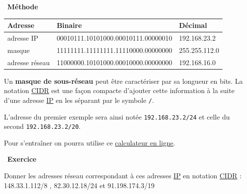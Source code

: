 \documentclass[
  11pt,
]{article}
\newcommand{\passthrough}[1]{#1}
\newcounter{exo}
\newenvironment{exercice}[1]
{\par \medskip   \addtocounter{exo}{1} \noindent  
\begin{bclogo}[arrondi =0.1,   noborder = true, logo=\bccrayon, marge=4]{~\textbf{Exercice} \textbf{\theexo} {\itshape #1} }  \par}
{
\end{bclogo}
 \par \bigskip }
\newenvironment{methode}[1]
{\par \medskip    \noindent  
 \begin {bclogo}[arrondi =0.1,logo=\bcoutil, marge=4,noborder = true] {~\textbf{Méthode}   {\itshape #1} }  \par}
{
\end{bclogo}
 \par \bigskip }
\begin{document}
\begin{methode}{}
\begin{longtable}[]{@{}lll@{}}
\toprule
Adresse & Binaire & Décimal \\
\midrule
\endhead
adresse IP & 00010111.10101000.00010111.00000010 & 192.168.23.2 \\
masque & 11111111.11111111.11110000.00000000 & 255.255.112.0 \\
adresse réseau & 11000000.10101000.00010000.00000000 & 192.168.16.0 \\
\bottomrule
\end{longtable}

Un \textbf{masque de sous-réseau} peut être caractériser par sa longueur
en bits. La notation
\href{https://fr.wikipedia.org/wiki/Sous-r\%C3\%A9seau}{CIDR} est une
façon compacte d'ajouter cette information à la suite d'une adresse
\href{https://fr.wikipedia.org/wiki/Internet_Protocol}{IP} en les
séparant par le symbole \passthrough{\lstinline!/!}.

L'adresse du premier exemple sera ainsi notée
\passthrough{\lstinline!192.168.23.2/24!} et celle du second
\passthrough{\lstinline!192.168.23.2/20!}.

Pour s'entraîner on pourra utilise ce
\href{https://cric.grenoble.cnrs.fr/Administrateurs/Outils/CalculMasque/}{calculateur
en ligne}.

\end{methode}

\begin{exercice}{}

Donner les adresses réseau correspondant à ces adresses
\href{https://fr.wikipedia.org/wiki/Internet_Protocol}{IP} en notation
\href{https://fr.wikipedia.org/wiki/Sous-r\%C3\%A9seau}{CIDR} :
148.33.1.112/8 , 82.30.12.18/24 et 91.198.174.3/19

\end{exercice}
\end{document}
